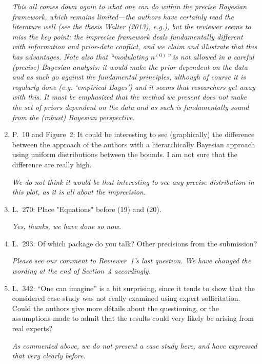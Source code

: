 \documentclass[Journal,SectionNumbers,SingleSpace,InsideFigs]{ascelike}
\newcommand{\uz}{^{(0)}} %
\def\nz{n\uz}
\begin{document}
\begin{enumerate}
\smallskip
\emph{This all comes down again to what one can do within the precise Bayesian framework,
which remains limited---the authors have certainly read the literature well (see the thesis Walter (2013), e.g.),
but the reviewer seems to miss the key point:
the imprecise framework deals fundamentally different with information and prior-data conflict,
and we claim and illustrate that this has advantages.
Note also that ``modulating $\nz$'' is not allowed in a careful (precise) Bayesian analysis:
it would make the prior dependent on the data and as such go against the fundamental principles,
although of course it is regularly done (e.g. `empirical Bayes') and it seems that researchers get away with this.
It must be emphasized that the method we present does not make the set of priors dependent on the data
and as such is fundamentally sound from the (robust) Bayesian perspective.}

\smallskip
\item P.~10 and Figure~2: It could be interesting to see (graphically) the difference between the approach of the authors
with a hierarchically Bayesian approach using uniform distributions between the bounds.
I am not sure that the difference are really high.

\smallskip
\emph{We do not think it would be that interesting to see any precise distribution in this plot, as it is all about the imprecision.}

\smallskip
\item L.~270: Place "Equations" before (19) and (20).

\smallskip
\emph{Yes, thanks, we have done so now.}

\smallskip
\item L.~293: Of which package do you talk? Other precisions from the submission?

\smallskip
\emph{Please see our comment to Reviewer~1's last question. We have changed the wording at the end of Section~4 accordingly.}

\smallskip
\item L.~342: ``One can imagine'' is a bit surprising,
since it tends to show that the considered case-study was not really examined using expert sollicitation.
Could the authors give more détails about the questioning,
or the assumptions made to admit that the results could very likely be arising from real experts?

\smallskip
\emph{As commented above, we do not present a case study here, and have expressed that very clearly before.}


\end{enumerate}
\end{document}
